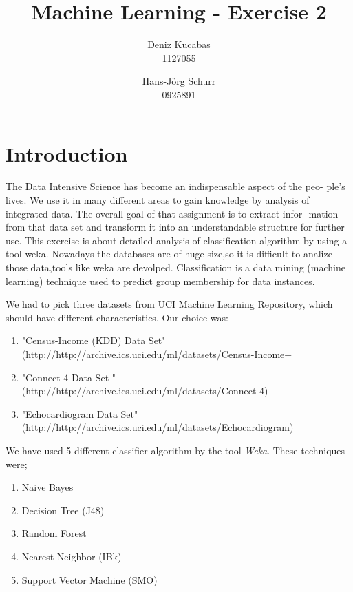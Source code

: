 \documentclass[a4paper]{article}
\begin{document}
\title{Machine Learning - Exercise 2 }
\author{
        Deniz Kucabas \\ 
                     1127055 
                    \and
                    Hans-Jörg Schurr \\ 0925891
}

\maketitle
\tableofcontents
\newpage

\section{Introduction}
The Data Intensive Science has become an indispensable aspect of the peo-
ple's lives. We use it in many different areas to gain knowledge by analysis
of integrated data. The overall goal of that assignment is to extract infor-
mation from that data set and transform it into an understandable structure
for further use. This exercise is about detailed analysis of classification algorithm by using a tool weka.
Nowadays the databases are of huge size,so it is difficult to analize those data,tools like weka are 
devolped. Classification is a data mining (machine learning) technique used 
to predict group membership for data instances. 

We had to pick three datasets from UCI Machine Learning Repository, which should have different characteristics. 
Our choice was:
\begin{enumerate}
    \item "Census-Income (KDD) Data Set" \\ 
(http://http://archive.ics.uci.edu/ml/datasets/Census-Income+%
    \item "Connect-4 Data Set " \\
        (http://http://archive.ics.uci.edu/ml/datasets/Connect-4)
    \item "Echocardiogram  Data Set" \\
        (http://http://archive.ics.uci.edu/ml/datasets/Echocardiogram)
\end{enumerate}

We have used 5 different classifier algorithm by the tool \emph{Weka}. 
These techniques were;
\begin{enumerate}
    \item Naive Bayes
    \item Decision Tree (J48)
    \item Random Forest
    \item Nearest Neighbor (IBk)
    \item Support Vector Machine (SMO)
\end{enumerate}
\end{document}
